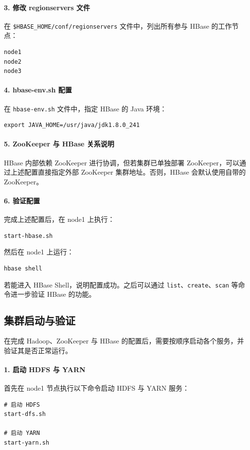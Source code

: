 \documentclass[]{bitreport}
\begin{document}
\paragraph{3. 修改 regionservers 文件}
在 \texttt{\$HBASE\_HOME/conf/regionservers} 文件中，列出所有参与 HBase 的工作节点：
\begin{lstlisting}[style=shell, caption={regionservers 配置}]
node1
node2
node3
\end{lstlisting}

\paragraph{4. hbase-env.sh 配置}
在 \texttt{hbase-env.sh} 文件中，指定 HBase 的 Java 环境：
\begin{lstlisting}[style=shell]
export JAVA_HOME=/usr/java/jdk1.8.0_241
\end{lstlisting}

\paragraph{5. ZooKeeper 与 HBase 关系说明}
HBase 内部依赖 ZooKeeper 进行协调，但若集群已单独部署 ZooKeeper，可以通过上述配置直接指定外部 ZooKeeper 集群地址。否则，HBase 会默认使用自带的 ZooKeeper。

\paragraph{6. 验证配置}
完成上述配置后，在 node1 上执行：
\begin{lstlisting}[style=shell]
start-hbase.sh
\end{lstlisting}

然后在 node1 上运行：
\begin{lstlisting}[style=shell]
hbase shell
\end{lstlisting}

若能进入 HBase Shell，说明配置成功。之后可以通过 \texttt{list}、\texttt{create}、\texttt{scan} 等命令进一步验证 HBase 的功能。


\subsection{集群启动与验证}

在完成 Hadoop、ZooKeeper 与 HBase 的配置后，需要按顺序启动各个服务，并验证其是否正常运行。

\paragraph{1. 启动 HDFS 与 YARN}
首先在 node1 节点执行以下命令启动 HDFS 与 YARN 服务：
\begin{lstlisting}[style=shell]
# 启动 HDFS
start-dfs.sh

# 启动 YARN
start-yarn.sh
\end{lstlisting}
\end{document}
